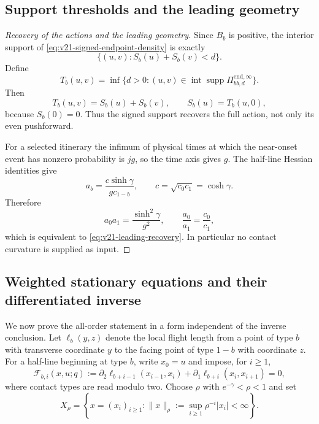 \subsection{Support thresholds and the leading geometry}

\begin{proof}[Recovery of the actions and the leading geometry]
Since $B_b$ is positive, the interior support of
\eqref{eq:v21-signed-endpoint-density} is exactly
\[
 \{(u,v):S_b(u)+S_b(v)<d\}.
\]
Define
\[
 T_b(u,v)=\inf\{d>0:(u,v)\in
       \operatorname{int}\operatorname{supp}
       \Pi^{\mathrm{end},\infty}_{bb,d}\}.
\]
Then
\begin{equation}\label{eq:v21-support-threshold}
 T_b(u,v)=S_b(u)+S_b(v),\qquad S_b(u)=T_b(u,0),
\end{equation}
because $S_b(0)=0$.  Thus the signed support recovers the full action, not
only its even pushforward.

For a selected itinerary the infimum of physical times at which the
near-onset event has nonzero probability is $jg$, so the time axis gives
$g$.  The half-line Hessian identities give
\[
 a_b=\frac{c\sinh\gamma}{gc_{1-b}},
 \qquad c=\sqrt{c_0c_1}=\cosh\gamma.
\]
Therefore
\[
 a_0a_1=\frac{\sinh^2\gamma}{g^2},
 \qquad \frac{a_0}{a_1}=\frac{c_0}{c_1},
\]
which is equivalent to \eqref{eq:v21-leading-recovery}.  In particular no
contact curvature is supplied as input.
\end{proof}

\subsection{Weighted stationary equations and their differentiated inverse}

We now prove the all-order statement in a form independent of the inverse
conclusion.  Let $\ell_b(y,z)$ denote the local flight length from a point of
type $b$ with transverse coordinate $y$ to the facing point of type $1-b$
with coordinate $z$.  For a half-line beginning at type $b$, write
$x_0=u$ and impose, for $i\ge1$,
\begin{equation}\label{eq:v21-stationary-equations}
 \mathscr F_{b,i}(x,u;q)
 :=\partial_2\ell_{b+i-1}(x_{i-1},x_i)
   +\partial_1\ell_{b+i}(x_i,x_{i+1})=0,
\end{equation}
where contact types are read modulo two.  Choose
$\rho$ with $e^{-\gamma}<\rho<1$ and set
\[
 X_\rho=\left\{x=(x_i)_{i\ge1}:
        \|x\|_\rho:=\sup_{i\ge1}\rho^{-i}|x_i|<\infty\right\}.
\]

